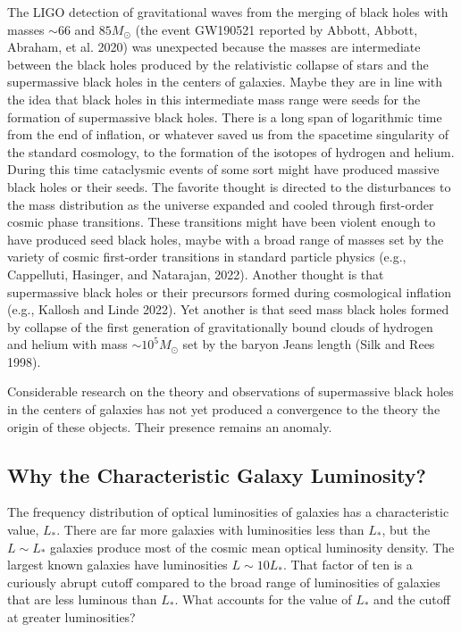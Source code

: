 \documentclass[fleqn,usenatbib]{mnras}
\begin{document}
The LIGO detection of gravitational waves from the merging of black holes with masses $\sim 66$ and $85 M_\odot$ (the event GW190521 reported by Abbott, Abbott, Abraham, et al. 2020) was unexpected because the masses are intermediate between the black holes produced by the relativistic collapse of stars and the supermassive black holes in the centers of galaxies. Maybe they are in line with the idea that black holes in this intermediate mass range were seeds for the formation of supermassive black holes. There is a long span of logarithmic time from the end of inflation, or whatever saved us from the spacetime  singularity of the standard cosmology, to the formation of the isotopes of hydrogen and helium. During this time cataclysmic events of some sort might have produced massive black holes or their seeds.  The favorite thought is directed to the disturbances to the mass distribution as the universe expanded and cooled through first-order cosmic phase transitions. These transitions might have been violent enough to have produced seed black holes, maybe with a broad range of masses set by the variety of cosmic first-order transitions in standard particle physics (e.g., Cappelluti, Hasinger, and Natarajan, 2022). Another thought is that supermassive black holes or their precursors  formed during cosmological inflation (e.g., Kallosh and Linde 2022). Yet another is that seed mass black holes formed by collapse of the first generation of gravitationally bound clouds of hydrogen and helium with mass $\sim 10^5M_\odot$ set by the baryon Jeans length (Silk and Rees 1998). 

Considerable research on the theory and observations of supermassive black holes in the centers of galaxies has not yet produced a convergence to the theory the origin of these objects. Their presence remains an anomaly.

\subsection{Why the Characteristic Galaxy Luminosity?}\label{sec:Lstar}

The frequency distribution of optical luminosities of galaxies has a characteristic value, $L_\ast$. There are far more galaxies with luminosities less than $L_\ast$, but the $L\sim L_\ast$ galaxies produce most of the cosmic mean optical luminosity density. The largest known galaxies have luminosities $L\sim 10 L_\ast$. That factor of ten is a curiously abrupt cutoff compared to the broad range of luminosities of galaxies that are less luminous than $L_\ast$. What accounts for the value of $L_\ast$ and the cutoff at greater luminosities?
\end{document}

